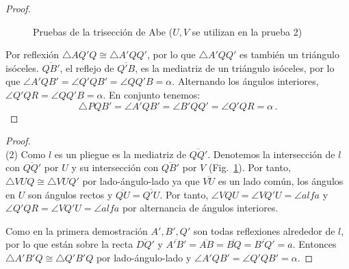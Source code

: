 \begin{proof}
\begin{figure}[ht]
\begin{center}
\end{center}
\caption{Pruebas de la trisección de Abe ($U,V$ se utilizan en la prueba 2)}\label{f.abe2}
\end{figure}

Por reflexión $\triangle AQ'Q\cong \triangle A'QQ'$, por lo que $\triangle A'QQ'$ es también un triángulo isóceles.
$\overline{QB'}$, el reflejo de $\overline{Q'B}$, es la mediatriz de un triángulo isóceles, por lo que $\angle A'QB'=\angle Q'QB'=\angle QQ'B=\alpha$.
Alternando los ángulos interiores, $\angle Q'QR=\angle QQ'B=\alpha$.
En conjunto tenemos:
\[
\triangle PQB'=\angle A'QB'=\angle B'QQ'=\angle Q'QR=\alpha\,.
\]
\end{proof}

\begin{proof}
\mbox{}\\
(2)
Como $l$ es un pliegue es la mediatriz de $\overline{QQ'}$. Denotemos la intersección de $l$ con $\overline{QQ'}$ por $U$ y su intersección con $\overline{QB'}$ por $V$ (Fig.~\ref{f.abe2}). Por tanto, $\triangle VUQ\cong \triangle VUQ'$ por lado-ángulo-lado ya que $\overline{VU}$ es un lado común, los ángulos en $U$ son ángulos rectos y $\overline{QU}=\overline{Q'U}$. Por tanto, $\angle VQU=\angle VQ'U=\angle alfa$ y $\angle Q'QR=\angle VQ'U=\angle alfa$ por alternancia de ángulos interiores.

Como en la primera demostración $A', B', Q'$ son todas reflexiones alrededor de $l$, por lo que están sobre la recta $\overline{DQ'}$ y $\overline{A'B'}=\overline{AB}=\overline{BQ}=\overline{B'Q'}=a$. Entonces $\triangle A'B'Q\cong\triangle Q'B'Q$ por lado-ángulo-lado y $\angle A'QB'=\angle Q'QB'=\alpha$.
\end{proof}

